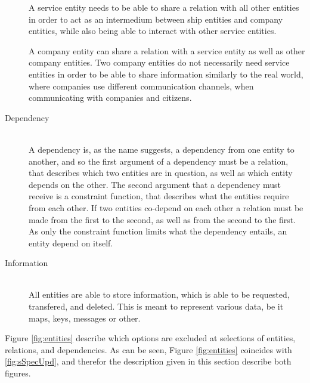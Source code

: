 \begin{description}
		A service entity needs to be able to share a relation with all other entities in order to act as an intermedium between ship entities and company entities, while also being able to interact with other service entities.

		A company entity can share a relation with a service entity as well as other company entities. Two company entities do not necessarily need service entities in order to be able to share information similarly to the real world, where companies use different communication channels, when communicating with companies and citizens.
	\item[Dependency]\ \\
		A dependency is, as the name suggests, a dependency from one entity to another, and so the first argument of a dependency must be a relation, that describes which two entities are in question, as well as which entity depends on the other. The second argument that a dependency must receive is a constraint function, that describes what the entities require from each other. If two entities co-depend on each other a relation must be made from the first to the second, as well as from the second to the first. As only the constraint function limits what the dependency entails, an entity  depend on itself.
	\item[Information]\ \\
		All entities are able to store information, which is able to be requested, transfered, and deleted. This is meant to represent various data, be it maps, keys, messages or other.
\end{description}

Figure \ref{fig:entities} describe which options are excluded at selections of entities, relations, and dependencies. As can be seen, Figure \ref{fig:entities} coincides with \ref{fig:sSpecUpd}, and therefor the description given in this section describe both figures. 

